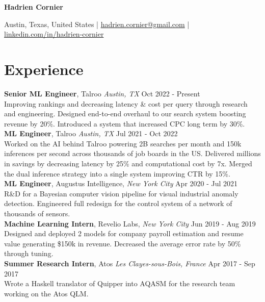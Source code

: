 \documentclass[a4paper,10pt]{article}
\begin{document}
    \pagestyle{empty}

    \centerline{\huge\bf Hadrien Cornier}
    \vspace{2mm}
    \centerline{Austin, Texas, United States | \href{mailto:hadrien.cornier@gmail.com}{hadrien.cornier@gmail.com} | \href{https://linkedin.com/in/hadrien-cornier}{linkedin.com/in/hadrien-cornier}}

    \section*{Experience}
    \noindent\textbf{Senior ML Engineer}, Talroo  \textit{Austin, TX} \hfill Oct 2022 - Present\\
    Improving rankings and decreasing latency \& cost per query through research and engineering. Designed end-to-end overhaul to our search system boosting revenue by 20\%. Introduced a system that increased CPC long term by 30\%.\\

    \noindent\textbf{ML Engineer}, Talroo \textit{Austin, TX} \hfill Jul 2021 - Oct 2022\\
    Worked on the AI behind Talroo powering 2B searches per month and 150k inferences per second across thousands of job boards in the US. Delivered millions in savings by decreasing latency by 25\% and computational cost by 7x. Merged the dual inference strategy into a single system improving CTR by 15\%.\\

    \noindent\textbf{ML Engineer}, Augustus Intelligence, \textit{New York City} \hfill Apr 2020 - Jul 2021\\
    R\&D for a Bayesian computer vision pipeline for visual industrial anomaly detection. Engineered full redesign for the control system of a network of thousands of sensors.\\

    \noindent\textbf{Machine Learning Intern}, Revelio Labs, \textit{New York City} \hfill Jun 2019 - Aug 2019\\
    Designed and deployed 2 models for company payroll estimation and resume value generating \$150k in revenue. Decreased the average error rate by 50\% through tuning.\\

    \noindent\textbf{Summer Research Intern}, Atos \textit{Les Clayes-sous-Bois, France} \hfill Apr 2017 - Sep 2017\\
    Wrote a Haskell translator of Quipper into AQASM for the research team working on the Atos QLM.\\
\end{document}
